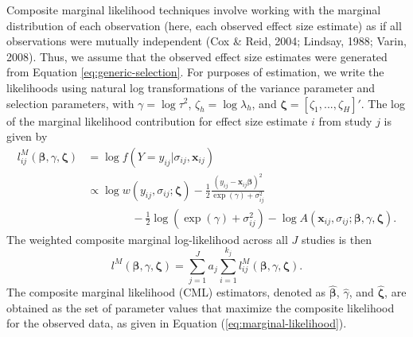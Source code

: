 \documentclass[
  man, donotrepeattitle,floatsintext]{apa7}
\begin{document}
Composite marginal likelihood techniques involve working with the marginal distribution of each observation (here, each observed effect size estimate) as if all observations were mutually independent (Cox \& Reid, 2004; Lindsay, 1988; Varin, 2008).
Thus, we assume that the observed effect size estimates were generated from Equation \eqref{eq:generic-selection}.
For purposes of estimation, we write the likelihoods using natural log transformations of the variance parameter and selection parameters, with \(\gamma = \log \tau^2\), \(\zeta_h = \log \lambda_h\), and \(\boldsymbol\zeta = \left[\zeta_1,...,\zeta_H\right]'\).
The log of the marginal likelihood contribution for effect size estimate \(i\) from study \(j\) is given by
\begin{align}
l^M_{ij}\left(\boldsymbol\beta, \gamma, \boldsymbol\zeta \right) &= \log f\left(Y = y_{ij} | \sigma_{ij}, \mathbf{x}_{ij}\right) \nonumber \\
&\propto \log w\left(y_{ij}, \sigma_{ij}; \boldsymbol\zeta \right) - \frac{1}{2} \frac{\left(y_{ij} - \mathbf{x}_{ij} \boldsymbol\beta\right)^2}{\exp(\gamma) + \sigma_{ij}^2} \nonumber\\
& \qquad \qquad  - \frac{1}{2}\log\left(\exp(\gamma) + \sigma_{ij}^2\right) - \log A\left(\mathbf{x}_{ij}, \sigma_{ij}; \boldsymbol\beta, \gamma, \boldsymbol\zeta \right). \label{eq:log-like-ij}
\end{align}
The weighted composite marginal log-likelihood across all \(J\) studies is then
\begin{equation}
\label{eq:marginal-likelihood}
l^M\left(\boldsymbol\beta, \gamma, \boldsymbol\zeta\right) = \sum_{j=1}^J  a_j \sum_{i=1}^{k_j} l^M_{ij}\left(\boldsymbol\beta, \gamma, \boldsymbol\zeta\right).
\end{equation}
The composite marginal likelihood (CML) estimators, denoted as \(\boldsymbol{\hat\beta}\), \(\hat\gamma\), and \(\boldsymbol{\hat\zeta}\), are obtained as the set of parameter values that maximize the composite likelihood for the observed data, as given in Equation (\ref{eq:marginal-likelihood}).
\end{document}
